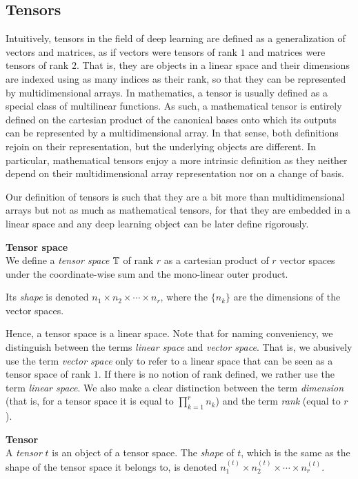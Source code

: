 \subsection{Tensors}

Intuitively, tensors in the field of deep learning are defined as a generalization of vectors and matrices, as if vectors were tensors of rank $1$ and matrices were tensors of rank $2$. That is, they are objects in a linear space and their dimensions are indexed using as many indices as their rank, so that they can be represented by multidimensional arrays. In mathematics, a tensor is usually defined as a special class of multilinear functions. As such, a mathematical tensor is entirely defined on the cartesian product of the canonical bases onto which its outputs can be represented by a multidimensional array. In that sense, both definitions rejoin on their representation, but the underlying objects are different. In particular, mathematical tensors enjoy a more intrinsic definition as they neither depend on their multidimensional array representation nor on a change of basis.

Our definition of tensors is such that they are a bit more than multidimensional arrays but not as much as mathematical tensors, for that they are embedded in a linear space and any deep learning object can be later define rigorously.

\begin{definition}\textbf{Tensor space}\\
We define a \emph{tensor space} $\mathbb{T}$ of rank $r$ as a cartesian product of $r$ vector spaces under the coordinate-wise sum and the mono-linear outer product.

Its \emph{shape} is denoted $n_1 \times n_2 \times \cdots \times n_r$, where the $\{n_k\}$ are the dimensions of the vector spaces.
\end{definition}

Hence, a tensor space is a linear space. Note that for naming conveniency, we distinguish between the terms \emph{linear space} and \emph{vector space}. That is, we abusively use the term \emph{vector space} only to refer to a linear space that can be seen as a tensor space of rank $1$. If there is no notion of rank defined, we rather use the term \emph{linear space}.
We also make a clear distinction between the term \emph{dimension} (that is, for a tensor space it is equal to $\displaystyle \prod_{k=1}^r n_k$) and the term \emph{rank} (equal to $r$).

\begin{definition}\textbf{Tensor}\\
A \emph{tensor} $t$ is an object of a tensor space. The \emph{shape} of $t$, which is the same as the shape of the tensor space it belongs to, is denoted $n_1^{(t)} \times n_2^{(t)} \times \cdots \times n_r^{(t)}$.
\end{definition}


